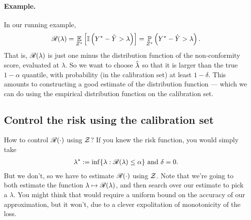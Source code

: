 \documentclass[twoside,11pt]{article}
\numberwithin{equation}{section}
\begin{document}
\paragraph{Example. }
In our running example,
%
\begin{align*}
%
\risk(\lambda) =
    \expect{\znew}{\ind{\ynew - \yhat > \lambda}} = 
    \p{\znew}{\ynew - \yhat > \lambda}.
%
\end{align*}
%
That is, $\mathscr{R}(\lambda)$ is just one minus the distribution function of the
non-conformity score, evaluated at $\lambda$.  So we want to choose $\hat{\lambda}$
so that it is larger than the true $1-\alpha$ quantile, with probability (in the
calibration set) at least $1-\delta$.  This amounts to constructing a good
estimate of the distribution function --- which we can do using the empirical
distribution function on the calibration set.



\subsection{Control the risk using the calibration set} 

How to control $\mathscr{R}(\cdot)$ using $\mathcal{Z}$? 
If you knew the risk function, you would simply take
%
\begin{align*}
    \lambda^{*} := \inf \{ \lambda: \mathscr{R}(\lambda) \le \alpha \}
    \textrm{ and }\delta = 0.
\end{align*}
%
But we don't, so we have to estimate $\mathscr{R}(\cdot)$ using $\mathcal{Z}$. Note that
we're going to both estimate the function $\lambda \mapsto \mathscr{R}(\lambda)$, and
then search over our estimate to pick a $\lambda$.  You might think that would
require a uniform bound on the accuracy of our approximation, but it won't, due
to a clever expolitation of monotonicity of the loss.
\end{document}

